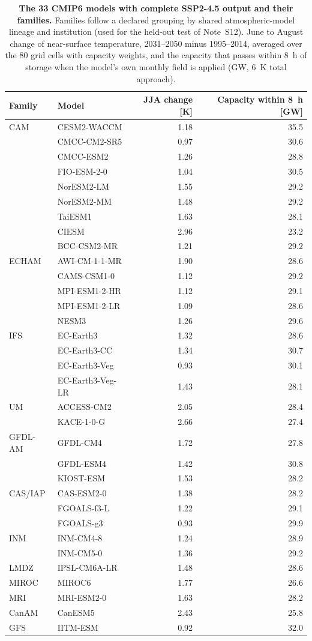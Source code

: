 \begin{table}[p]
\centering
\small
\caption{\textbf{The 33 CMIP6 models with complete SSP2-4.5 output and their families.} Families follow a declared grouping by shared atmospheric-model lineage and institution (used for the held-out test of Note~S12). June to August change of near-surface temperature, 2031--2050 minus 1995--2014, averaged over the 80 grid cells with capacity weights, and the capacity that passes within 8~h of storage when the model's own monthly field is applied (GW, 6~K total approach).}\label{tab:s6}
\begin{tabular}{@{}llrr@{}}
\toprule
Family & Model & JJA change [K] & Capacity within 8~h [GW]\\
\midrule
CAM & CESM2-WACCM & 1.18 & 35.5 \\
 & CMCC-CM2-SR5 & 0.97 & 30.6 \\
 & CMCC-ESM2 & 1.26 & 28.8 \\
 & FIO-ESM-2-0 & 1.04 & 30.5 \\
 & NorESM2-LM & 1.55 & 29.2 \\
 & NorESM2-MM & 1.48 & 29.2 \\
 & TaiESM1 & 1.63 & 28.1 \\
 & CIESM & 2.96 & 23.2 \\
 & BCC-CSM2-MR & 1.21 & 29.2 \\
ECHAM & AWI-CM-1-1-MR & 1.90 & 28.6 \\
 & CAMS-CSM1-0 & 1.12 & 29.2 \\
 & MPI-ESM1-2-HR & 1.12 & 29.1 \\
 & MPI-ESM1-2-LR & 1.09 & 28.6 \\
 & NESM3 & 1.26 & 29.6 \\
IFS & EC-Earth3 & 1.32 & 28.6 \\
 & EC-Earth3-CC & 1.34 & 30.7 \\
 & EC-Earth3-Veg & 0.93 & 30.1 \\
 & EC-Earth3-Veg-LR & 1.43 & 28.1 \\
UM & ACCESS-CM2 & 2.05 & 28.4 \\
 & KACE-1-0-G & 2.66 & 27.4 \\
GFDL-AM & GFDL-CM4 & 1.72 & 27.8 \\
 & GFDL-ESM4 & 1.42 & 30.8 \\
 & KIOST-ESM & 1.53 & 28.2 \\
CAS/IAP & CAS-ESM2-0 & 1.38 & 28.2 \\
 & FGOALS-f3-L & 1.22 & 29.1 \\
 & FGOALS-g3 & 0.93 & 29.9 \\
INM & INM-CM4-8 & 1.24 & 28.9 \\
 & INM-CM5-0 & 1.36 & 29.2 \\
LMDZ & IPSL-CM6A-LR & 1.48 & 28.6 \\
MIROC & MIROC6 & 1.77 & 26.6 \\
MRI & MRI-ESM2-0 & 1.63 & 28.2 \\
CanAM & CanESM5 & 2.43 & 25.8 \\
GFS & IITM-ESM & 0.92 & 32.0 \\
\bottomrule
\end{tabular}
\end{table}
